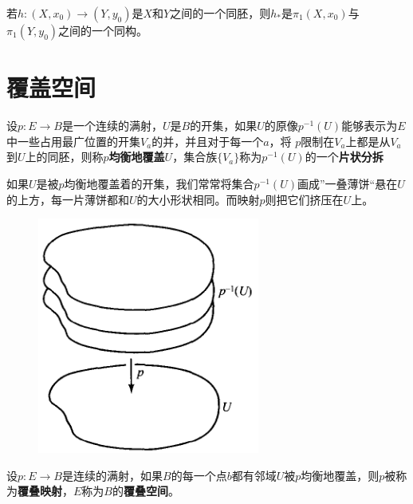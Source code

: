 \begin{mdframed}
    \begin{corollary}
        若$h:(X,x_0)\rightarrow (Y,y_0)$是$X$和$Y$之间的一个同胚，则$h_*$是$\pi_1(X,x_0)$与$\pi_1(Y,y_0)$之间的一个同构。
    \end{corollary}
\end{mdframed}

\section{覆盖空间}

\begin{define}
    设$p:E\rightarrow B$是一个连续的满射，$U$是$B$的开集，如果$U$的原像$p^{-1}(U)$能够表示为$E$中一些占用最广位置的开集$V_a$的并，并且对于每一个$a$，将
    $p$限制在$V_a$上都是从$V_a$到$U$上的同胚，则称$p$\textbf{均衡地覆盖}$U$，集合族$\{V_a\}$称为$p^{-1}(U)$的一个\textbf{片状分拆}
\end{define}

\vspace*{1em}

如果$U$是被$p$均衡地覆盖着的开集，我们常常将集合$p^{-1}(U)$画成”一叠薄饼“悬在$U$的上方，每一片薄饼都和$U$的大小形状相同。而映射$p$则把它们挤压在$U$上。

\begin{figure}[H]
    \centering
    \includegraphics[scale=0.4]{figures/覆叠空间.png}
    \caption{}
\end{figure}

\begin{define}
    设$p:E\rightarrow B$是连续的满射，如果$B$的每一个点$b$都有邻域$U$被$p$均衡地覆盖，则$p$被称为\textbf{覆叠映射}，$E$称为$B$的\textbf{覆叠空间}。
\end{define}

